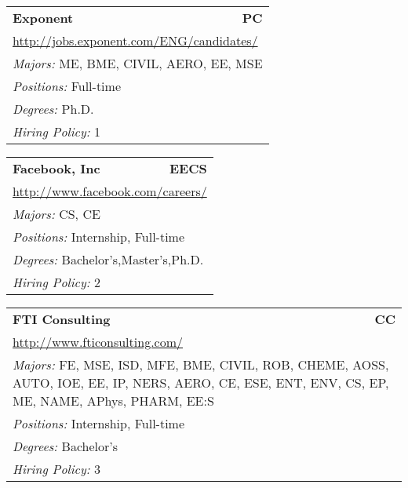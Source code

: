 \documentclass[twoside]{article}
\begin{document}
\begin{center}
\begin{multicols}{3}
\begin{FlushLeft}
\begin{minipage}{\columnwidth}\begin{tabularx}{.95\columnwidth}{Xr}
                 {\Large\bf Exponent} & {\Large\bf PC}\\
    \multicolumn{2}{p{.95\columnwidth}}{\url{http://jobs.exponent.com/ENG/candidates/}}\\
    \multicolumn{2}{p{.95\columnwidth}}{\emph{Majors:} ME, BME, CIVIL, AERO, EE, MSE}\\
    \multicolumn{2}{p{.95\columnwidth}}{\emph{Positions:} Full-time}\\
    \multicolumn{2}{p{.95\columnwidth}}{\emph{Degrees:} Ph.D.}\\
    \multicolumn{2}{p{.95\columnwidth}}{\emph{Hiring Policy:} 1}\\
    \end{tabularx}
    
\end{minipage}
 
\begin{minipage}{\columnwidth}\begin{tabularx}{.95\columnwidth}{Xr}
                 {\Large\bf Facebook, Inc} & {\Large\bf EECS}\\
    \multicolumn{2}{p{.95\columnwidth}}{\url{http://www.facebook.com/careers/}}\\
    \multicolumn{2}{p{.95\columnwidth}}{\emph{Majors:} CS, CE}\\
    \multicolumn{2}{p{.95\columnwidth}}{\emph{Positions:} Internship, Full-time}\\
    \multicolumn{2}{p{.95\columnwidth}}{\emph{Degrees:} Bachelor's,Master's,Ph.D.}\\
    \multicolumn{2}{p{.95\columnwidth}}{\emph{Hiring Policy:} 2}\\
    \end{tabularx}
    
\end{minipage}
 
\begin{minipage}{\columnwidth}\begin{tabularx}{.95\columnwidth}{Xr}
                 {\Large\bf FTI Consulting} & {\Large\bf CC}\\
    \multicolumn{2}{p{.95\columnwidth}}{\url{http://www.fticonsulting.com/}}\\
    \multicolumn{2}{p{.95\columnwidth}}{\emph{Majors:} FE, MSE, ISD, MFE, BME, CIVIL, ROB, CHEME, AOSS, AUTO, IOE, EE, IP, NERS, AERO, CE, ESE, ENT, ENV, CS, EP, ME, NAME, APhys, PHARM, EE:S}\\
    \multicolumn{2}{p{.95\columnwidth}}{\emph{Positions:} Internship, Full-time}\\
    \multicolumn{2}{p{.95\columnwidth}}{\emph{Degrees:} Bachelor's}\\
    \multicolumn{2}{p{.95\columnwidth}}{\emph{Hiring Policy:} 3}\\
    \end{tabularx}
    

\end{minipage}
\end{FlushLeft}
\end{multicols}
\end{center}
\end{document}

